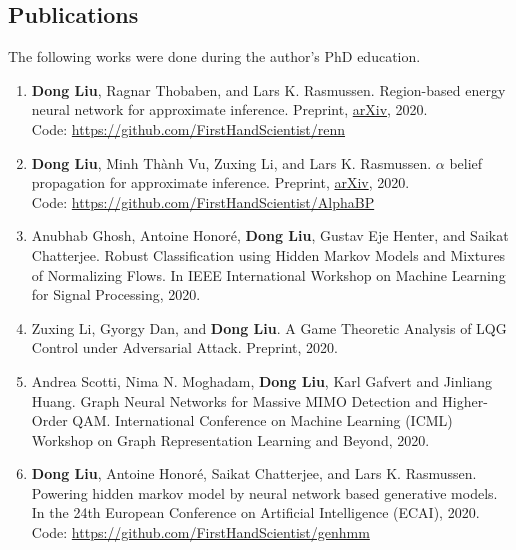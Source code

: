 \subsection{Publications}
The following works were done during the author's PhD education.
\begin{enumerate}
\item \label{pub-renn} \textbf{Dong Liu}, Ragnar Thobaben, and Lars K. Rasmussen. Region-based energy neural network for approximate inference. Preprint, \href{https://arxiv.org/abs/2006.09927}{arXiv}, 2020. \\
  Code: \href{https://github.com/FirstHandScientist/renn}{https://github.com/FirstHandScientist/renn}
  
\item \label{pub-alphabp-convergence}\textbf{Dong Liu}, Minh Th\`{a}nh Vu, Zuxing Li, and Lars K. Rasmussen. $\alpha$ belief propagation for approximate inference. Preprint, \href{https://arxiv.org/abs/2006.15363}{arXiv}, 2020.\\
  Code: \href{https://github.com/FirstHandScientist/AlphaBP}{https://github.com/FirstHandScientist/AlphaBP}

\item Anubhab Ghosh, Antoine Honor{\'e}, \textbf{Dong Liu}, Gustav Eje Henter, and Saikat Chatterjee. Robust Classification using Hidden Markov Models and Mixtures of Normalizing Flows. In IEEE International Workshop on Machine Learning for Signal Processing, 2020.

\item Zuxing Li, Gyorgy Dan, and \textbf{Dong Liu}. A Game Theoretic Analysis of LQG Control under Adversarial Attack. Preprint, 2020.

\item Andrea Scotti, Nima N. Moghadam, \textbf{Dong Liu}, Karl Gafvert and Jinliang Huang. Graph Neural Networks for Massive MIMO Detection and Higher-Order QAM. International Conference on Machine Learning (ICML) Workshop on Graph Representation Learning and Beyond, 2020.


\item \label{pub-hmm-flow} \textbf{Dong Liu}, Antoine Honor{\'e}, Saikat Chatterjee, and Lars K. Rasmussen. Powering hidden
  markov model by neural network based generative models. In the 24th European Conference on Artificial Intelligence (ECAI), 2020.\\
  Code: \href{https://github.com/FirstHandScientist/genhmm}{https://github.com/FirstHandScientist/genhmm}


\end{enumerate}
